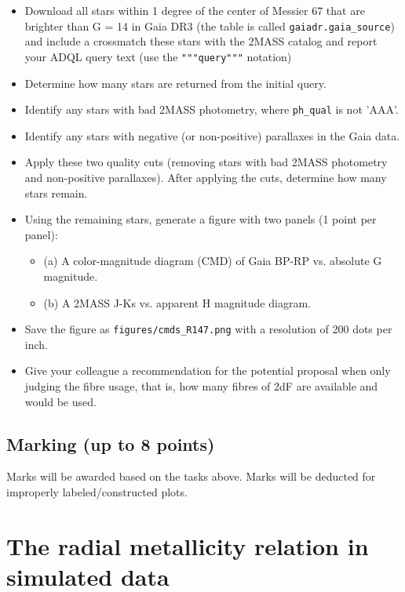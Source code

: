 \documentclass[a4paper,12pt]{article}
\begin{document}
\begin{itemize}
    \item Download all stars within 1 degree of the center of Messier 67  that are brighter than G = 14 in Gaia DR3 (the table is called \texttt{gaiadr.gaia\_source}) and include a crossmatch these stars with the 2MASS catalog and report your ADQL query text (use the \texttt{"""query"""} notation)
    \item Determine how many stars are returned from the initial query.
    \item Identify any stars with bad 2MASS photometry, where \texttt{ph\_qual} is not 'AAA'.
    \item Identify any stars with negative (or non-positive) parallaxes in the Gaia data.
    \item Apply these two quality cuts (removing stars with bad 2MASS photometry and non-positive parallaxes). After applying the cuts, determine how many stars remain.
    \item Using the remaining stars, generate a figure with two panels (1 point per panel):
    \begin{itemize}
        \item (a) A color-magnitude diagram (CMD) of Gaia BP-RP vs. absolute G magnitude.
        \item (b) A 2MASS J-Ks vs. apparent H magnitude diagram.
    \end{itemize}
    \item Save the figure as \texttt{figures/cmds\_R147.png} with a resolution of 200 dots per inch.
    \item Give your colleague a recommendation for the potential proposal when only judging the fibre usage, that is, how many fibres of 2dF are available and would be used.
\end{itemize}

\subsection{Marking (up to 8 points)}

Marks will be awarded based on the tasks above. Marks will be deducted for improperly labeled/constructed plots.

\newpage

\section{The radial metallicity relation in simulated data}
\end{document}

